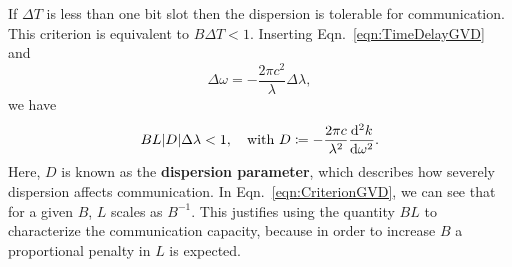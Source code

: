 \documentclass[%
 reprint,
 amsmath,amssymb,
 aps,
]{revtex4-2}
\begin{document}
If $\Delta T$ is less than one bit slot then 
the dispersion is tolerable for communication. 
This criterion is equivalent to 
$B \Delta T<1$. Inserting Eqn.~\ref{eqn:TimeDelayGVD} 
and 
\[
    \Delta \omega = 
    - \frac{2\pi c^{2}}{\lambda}
    \Delta \lambda ,
\]
we have 
\begin{equation}
    \label{eqn:CriterionGVD}
    BL \abs{D} \Delta \lambda <1, 
    \quad \text{with }
    D \coloneqq
    -\frac{2\pi c}{\lambda^{2}}
    \dv[2]{k}{\omega}.
\end{equation}
Here, $D$ is known as 
the \textbf{dispersion parameter}, 
which describes how severely dispersion affects communication. 
In Eqn.~\ref{eqn:CriterionGVD}, we can see that 
for a given $B$, $L$ scales as $B^{-1}$. 
This justifies using the quantity $BL$ to 
characterize the communication capacity, because 
in order to increase $B$ 
a proportional penalty in $L$ is expected.  
\end{document}
